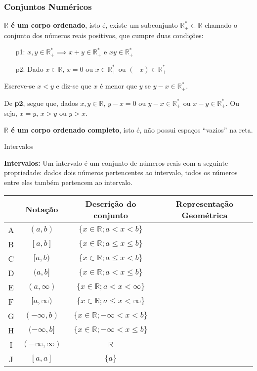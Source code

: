 \documentclass[hyperref={pdfpagelabels=false}]{beamer}
\begin{document}
\begin{frame}
\frametitle{Conjuntos Numéricos}
{\bf $\mathbb{R}$ é um corpo ordenado}, isto é, existe um subconjunto $\mathbb{R}_{+}^{*} \subset \mathbb{R}$ chamado o conjunto dos números reais positivos, que cumpre duas condições: \pause
\begin{itemize}
	\item [p1:] $x,y \in \mathbb{R}_{+}^{*} \implies x+y \in \mathbb{R}_{+}^{*}$ e $xy \in \mathbb{R}_{+}^{*}$ \pause
	\item [p2:] Dado $x \in \mathbb{R}$, $x=0$ ou $x \in \mathbb{R}_{+}^{*}$ ou $(-x) \in \mathbb{R}_{+}^{*}$ \pause
\end{itemize}

Escreve-se $x<y$ e diz-se que $x$ é menor que $y$ se $y-x \in \mathbb{R}_{+}^{*}$. \pause

De {\bf p2}, segue que, dados $x,y \in \mathbb{R}$, $y-x=0$ ou $y-x \in \mathbb{R}_{+}^{*}$ ou $x-y \in \mathbb{R}_{+}^{*}$. Ou seja, $x=y$, $x>y$ ou $y>x$. \pause

{\bf $\mathbb{R}$ é um corpo ordenado completo}, isto é, não possui espaços ``vazios'' na reta.

\end{frame}

\begin{frame}{Intervalos}

\textbf{Intervalos:} Um intervalo é um conjunto de números reais com a seguinte propriedade: dados dois números pertencentes ao intervalo, todos os números entre eles também pertencem ao intervalo. \pause

\begin{table}[h!]
	\centering
	\begin{tabular}{|c|c|c|c|}
		\hline
		&	Notação			& Descrição do conjunto						 & Representação Geométrica \\
		\hline
		A	& $(a,b)$		& $\{ x \in \mathbb{R} ; a< x <b \} $		 & 	\\
		\hline
		B	& $[a,b]$		& $\{ x \in \mathbb{R} ; a\leq x \leq b \} $ & \\
		\hline
		C	& $[a,b)$		& $\{ x \in \mathbb{R} ; a\leq  x <b \} $	 & \\	
		\hline
		D	& $(a,b]$		& $\{ x \in \mathbb{R} ; a< x \leq b \} $	 & \\
		\hline
		E	& $(a, \infty)$	& $\{ x \in \mathbb{R} ; a< x < \infty \} $  & \\
		\hline
		F	& $[a,\infty)$	& $\{ x \in \mathbb{R} ; a \leq x <\infty \}$& \\
		\hline
		G	& $(- \infty,b)$& $\{ x \in \mathbb{R} ; - \infty < x <b \} $& \\
		\hline
		H	& $(- \infty, b]$& $\{ x \in \mathbb{R} ; -\infty< x \leq b \} $	 & \\
		\hline
		I	& $(- \infty, \infty)$ & $\mathbb{R}$ &	\\
		\hline
		J	& $[a,a]$		& $\{a\}$									 & \\
		\hline
	\end{tabular}
\end{table}
 
\end{frame}
\end{document}
